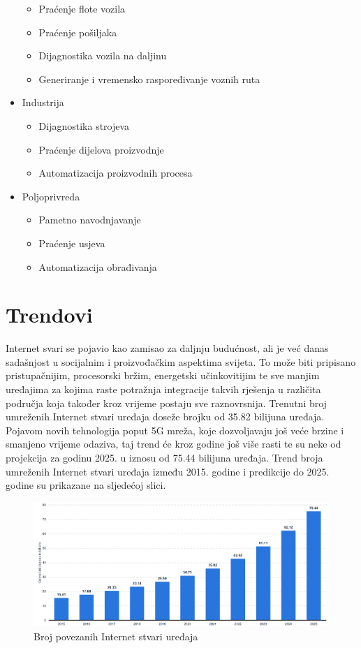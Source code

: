 \documentclass[times, utf8, diplomski]{fer}
\begin{document}
\begin{itemize}
    \begin{itemize}
        \item Praćenje flote vozila
        \item Praćenje pošiljaka
        \item Dijagnostika vozila na daljinu
        \item Generiranje i vremensko raspoređivanje voznih ruta
    \end{itemize}
    \item Industrija
    \begin{itemize}
        \item Dijagnostika strojeva
        \item Praćenje dijelova proizvodnje
        \item Automatizacija proizvodnih procesa
    \end{itemize}
    \item Poljoprivreda
    \begin{itemize}
        \item Pametno navodnjavanje
        \item Praćenje usjeva
        \item Automatizacija obrađivanja
    \end{itemize}
\end{itemize}

\section{Trendovi}
Internet svari se pojavio kao zamisao za daljnju budućnost, ali je već danas sadašnjost u socijalnim i proizvođačkim aspektima svijeta. To može biti pripisano pristupačnijim, procesorski bržim, energetski učinkovitijim te sve manjim uređajima za kojima raste potražnja integracije takvih rješenja u različita područja koja također kroz vrijeme postaju sve raznovrsnija. Trenutni broj umreženih Internet stvari uređaja doseže brojku od 35.82 bilijuna uređaja. Pojavom novih tehnologija poput 5G mreža, koje dozvoljavaju još veće brzine i smanjeno vrijeme odaziva, taj trend će kroz godine još više rasti te su neke od projekcija za godinu 2025. u iznosu od 75.44 bilijuna uređaja\citep{IotNumber}. Trend broja umreženih Internet stvari uređaja između 2015. godine i predikcije do 2025. godine su prikazane na sljedećoj slici. 
\begin{figure}[H]
    \centering
    \includegraphics[width=14cm]{images/number-of-installed-iot.png}
    \caption{Broj povezanih Internet stvari uređaja\citep{IotNumber}}
    \label{fig:iotdevices}
\end{figure}
\end{document}
